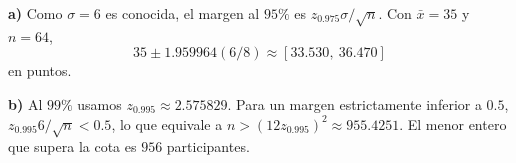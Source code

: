 \textbf{a)} Como $\sigma=6$ es conocida, el margen al $95\%$
es $z_{0.975}\sigma/\sqrt n$. Con $\bar x=35$ y $n=64$,
\[
35\pm1.959964(6/8)\approx\boxed{[33.530,\ 36.470]}
\]
en puntos.

\textbf{b)} Al $99\%$ usamos $z_{0.995}\approx2.575829$.
Para un margen estrictamente inferior a $0.5$,
$z_{0.995}6/\sqrt n<0.5$, lo que equivale a
$n>(12z_{0.995})^2\approx955.4251$.
El menor entero que supera la cota es $\boxed{956}$ participantes.
